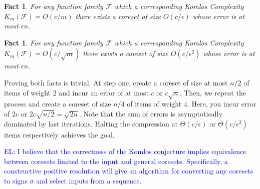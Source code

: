 \documentclass[anon,12pt]{colt2019} %
\newtheorem{fact}[theorem]{Fact}
\newcommand{\el}[1]{\textcolor{blue}{EL: #1}}
\newcommand{\eps}{\epsilon}
\newcommand{\F}{\mathcal{F}}
\begin{document}
\begin{fact}
For any function family $\F$ which a corresponding Komlos Complexity $K_m(\F) = O(c/m)$ there exists a coreset of size 
$O(c/\eps)$ whose error is at most $\eps n$.
\end{fact}
\begin{fact}
For any function family $\F$ which a corresponding Komlos Complexity $K_m(\F) = O(c/\sqrt{m})$ there exists a coreset of size 
$O(c/\eps^2)$ whose error is at most $\eps n$.
\end{fact}

\noindent Proving both facts is trivial. 
At step one, create a coreset of size at most $n/2$ of items of weight $2$ and incur an error of at most $c$ or $c \sqrt{n}$.
Then, we repeat the process and create a coreset of size $n/4$ of items of weight $4$. Here, you incur error of $2c$ or $2c\sqrt{n/2}  = \sqrt{2n}$.
Note that the sum of errors is asymptotically dominated by last iterations. 
Halting the compression at $\Theta(c/\eps)$ or $\Theta(c/\eps^2)$ items respectively achieves the goal.


%
%



\el{I believe that the correctness of the Komlos conjecture implies equivalence between coresets limited to the input and general coresets. Specifically, a constructive positive resolution will give an algorithm for converting any coresets to signs $\sigma$ and select inputs from a sequence.}
\end{document}
